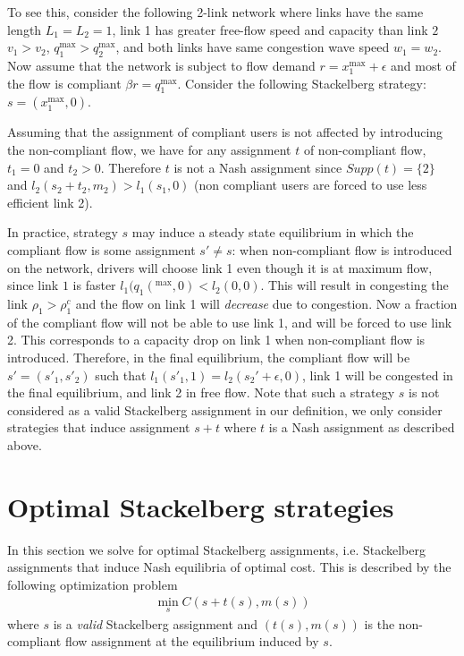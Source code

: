 To see this, consider the following 2-link network where links have the same length $L_1 = L_2 = 1$, link 1 has greater free-flow speed and capacity than link $2$ $v_1 > v_2$, $q_1^{\max} > q_2^{\max}$, and both links have same congestion wave speed $w_1 = w_2$.
Now assume that the network is subject to flow demand $r = x_1^{\max} + \epsilon$ and most of the flow is compliant $\beta r = q_1^{\max}$. Consider the following Stackelberg strategy: $s = (x_1^{\max}, 0)$.

Assuming that the assignment of compliant users is not affected by introducing the non-compliant flow, we have for any assignment $t$ of non-compliant flow, $t_1 = 0$ and $t_2 > 0$. Therefore $t$ is not a Nash assignment since $Supp(t) = \{ 2 \}$ and $l_2(s_2 + t_2, m_2) > l_1(s_1, 0)$ (non compliant users are forced to use less efficient link 2).

In practice, strategy $s$ may induce a steady state equilibrium in which the compliant flow is some assignment $s' \neq s$: when non-compliant flow is introduced on the network, drivers will choose link 1 even though it is at maximum flow, since link $1$ is faster $l_1(q_1(^{\max}, 0) < l_2(0, 0)$. This will result in congesting the link $\rho_1 > \rho_1^c$ and the flow on link 1 will \emph{decrease} due to congestion. Now a fraction of the compliant flow will not be able to use link 1, and will be forced to use link 2. This corresponds to a capacity drop on link 1 when non-compliant flow is introduced. Therefore, in the final equilibrium, the compliant flow will be $s' = (s'_1, s'_2)$ such that $l_1(s'_1, 1) = l_2(s_2' + \epsilon, 0)$, link 1 will be congested in the final equilibrium, and link 2 in free flow. Note that such a strategy $s$ is not considered as a valid Stackelberg assignment in our definition, we only consider strategies that induce assignment $s + t$ where $t$ is a Nash assignment as described above.









\section{Optimal Stackelberg strategies}

In this section we solve for optimal Stackelberg assignments, i.e. Stackelberg assignments that induce Nash equilibria of optimal cost. This is described by the following optimization problem
\begin{align*}
\min_s C\left( s + t(s), m(s) \right)
\end{align*}
where $s$ is a \emph{valid} Stackelberg assignment and $(t(s), m(s))$ is the non-compliant flow assignment at the equilibrium induced by $s$.

